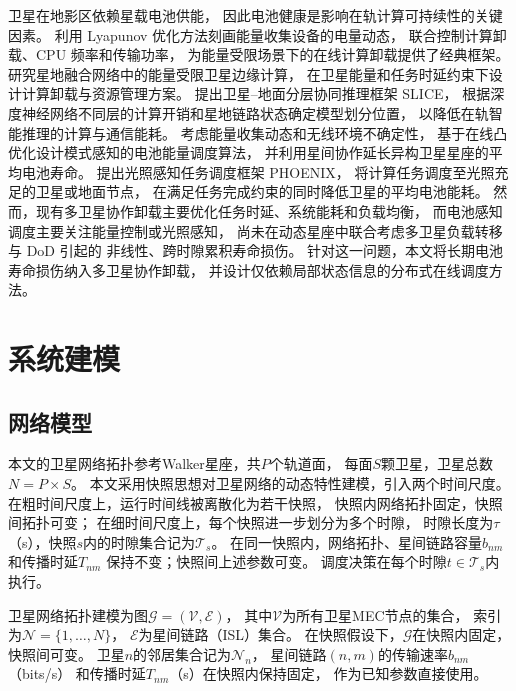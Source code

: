 \documentclass[a4paper,11pt]{article}
\begin{document}
卫星在地影区依赖星载电池供能，
因此电池健康是影响在轨计算可持续性的关键因素。
\cite{mao2016eh}利用 Lyapunov 优化方法刻画能量收集设备的电量动态，
联合控制计算卸载、CPU 频率和传输功率，
为能量受限场景下的在线计算卸载提供了经典框架。
\cite{energyconstrained}研究星地融合网络中的能量受限卫星边缘计算，
在卫星能量和任务时延约束下设计计算卸载与资源管理方案。
\cite{chen2025slice}提出卫星--地面分层协同推理框架 SLICE，
根据深度神经网络不同层的计算开销和星地链路状态确定模型划分位置，
以降低在轨智能推理的计算与通信能耗。
\cite{li2024battery}考虑能量收集动态和无线环境不确定性，
基于在线凸优化设计模式感知的电池能量调度算法，
并利用星间协作延长异构卫星星座的平均电池寿命。
\cite{liu2024phoenix}提出光照感知任务调度框架 PHOENIX，
将计算任务调度至光照充足的卫星或地面节点，
在满足任务完成约束的同时降低卫星的平均电池能耗。
然而，现有多卫星协作卸载主要优化任务时延、系统能耗和负载均衡，
而电池感知调度主要关注能量控制或光照感知，
尚未在动态星座中联合考虑多卫星负载转移与 DoD 引起的
非线性、跨时隙累积寿命损伤。
针对这一问题，本文将长期电池寿命损伤纳入多卫星协作卸载，
并设计仅依赖局部状态信息的分布式在线调度方法。
\section{系统建模}
\label{sec:system_model}

\subsection{网络模型}

本文的卫星网络拓扑参考Walker星座，共$P$个轨道面，
每面$S$颗卫星，卫星总数$N = P \times S$。
本文采用快照思想对卫星网络的动态特性建模，引入两个时间尺度。
在粗时间尺度上，运行时间线被离散化为若干快照，
快照内网络拓扑固定，快照间拓扑可变；
在细时间尺度上，每个快照进一步划分为多个时隙，
时隙长度为$\tau$（s），快照$s$内的时隙集合记为$\mathcal{T}_s$。
在同一快照内，网络拓扑、星间链路容量$b_{nm}$和传播时延$T_{nm}$
保持不变；快照间上述参数可变。
调度决策在每个时隙$t \in \mathcal{T}_s$内执行。

卫星网络拓扑建模为图$\mathcal{G} = (\mathcal{V}, \mathcal{E})$，
其中$\mathcal{V}$为所有卫星MEC节点的集合，
索引为$\mathcal{N} = \{1, \ldots, N\}$，
$\mathcal{E}$为星间链路（ISL）集合。
在快照假设下，$\mathcal{G}$在快照内固定，快照间可变。
卫星$n$的邻居集合记为$\mathcal{N}_n$，
星间链路$(n,m)$的传输速率$b_{nm}$（bits/s）
和传播时延$T_{nm}$（s）在快照内保持固定，
作为已知参数直接使用。
\end{document}
